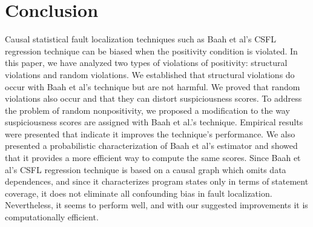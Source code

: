 \section{Conclusion}
Causal statistical fault localization techniques such as Baah et al’s CSFL regression technique can be biased when the positivity condition is violated.  In this paper, we have analyzed two types of violations of positivity: structural violations and random violations. We established that structural violations do occur with Baah et al’s technique but are not harmful.  We proved that random violations also occur and that they can distort suspiciousness scores.  To address the problem of random nonpositivity, we proposed a modification to the way suspiciousness scores are assigned with Baah et al.’s technique.  Empirical results were presented that indicate it improves the technique’s performance. We also presented a probabilistic characterization of Baah et al’s estimator and showed that it provides a more efficient way to compute the same scores. Since Baah et al’s CSFL regression technique is based on a causal graph which omits data dependences, and since it characterizes program states only in terms of statement coverage, it does not eliminate all confounding bias in fault localization.  Nevertheless, it seems to perform well, and with our suggested improvements it is computationally efficient.










